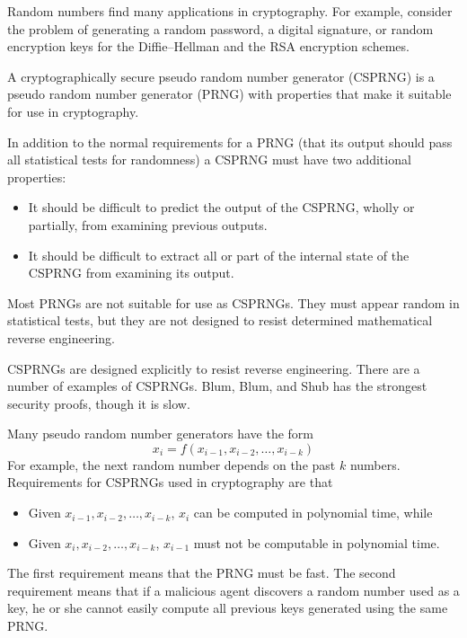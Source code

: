 \documentclass[justified,sixbynine]{tufte-book}
\theoremstyle{plain}%
\theoremstyle{definition}
\theoremstyle{remark}
\begin{document}
\begin{fullwidth}
Random numbers find many applications in cryptography. For example, consider
the problem of generating a random password, a digital signature, or random
encryption keys for the Diffie--Hellman and the RSA encryption schemes.

A cryptographically secure pseudo random number generator (CSPRNG) is a
pseudo random number generator (PRNG) with properties that make it suitable
for use in cryptography.

In addition to the normal requirements for a PRNG (that its output
should pass all statistical tests for randomness) a CSPRNG must have two
additional properties:

\begin{itemize}
\item  It should be difficult to predict the output of the CSPRNG, wholly or
partially, from examining previous outputs.

\item  It should be difficult to extract all or part of the internal state
of the CSPRNG from examining its output.
\end{itemize}

Most PRNGs are not suitable for use as CSPRNGs. They must appear random
in statistical tests, but they are not designed to resist determined
mathematical reverse engineering.

CSPRNGs are designed explicitly to resist reverse engineering. There are a
number of examples of CSPRNGs. Blum, Blum, and Shub has the strongest security
proofs, though it is slow.

Many pseudo random number generators have the form
\begin{equation}
x_i=f(x_{i-1},x_{i-2},\dots,x_{i-k})
\end{equation}
For example, the next random number depends on the past $k$ numbers. Requirements for CSPRNGs used in cryptography are that

\begin{itemize}
\item  Given $x_{i-1},x_{i-2},\dots,x_{i-k}$, $x_i$ can be computed in
polynomial time, while

\item  Given $x_i,x_{i-2},\dots,x_{i-k}$, $x_{i-1}$ must not be computable in
polynomial time.
\end{itemize}

The first requirement means that the PRNG must be fast. The second
requirement means that if a malicious agent discovers a random number used
as a key, he or she cannot easily compute all previous keys generated using the
same PRNG.


\end{fullwidth}
\end{document}
